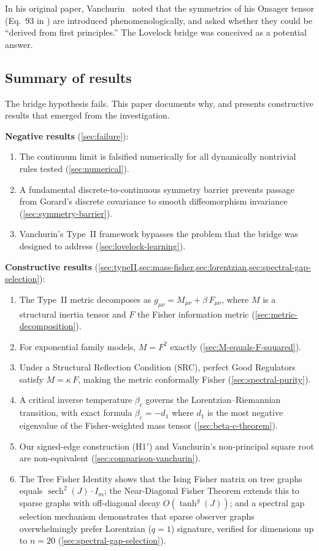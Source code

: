 \documentclass[11pt]{article}
\theoremstyle{definition}
\theoremstyle{remark}
\begin{document}
In his original paper, Vanchurin~\cite{Vanchurin2020} noted that the
symmetries of his Onsager tensor (Eq.~93 in \cite{Vanchurin2020}) are
introduced phenomenologically, and asked whether they could be
``derived from first principles.''
The Lovelock bridge was conceived as a potential answer.

\subsection{Summary of results}
\label{sec:summary}

The bridge hypothesis fails.
This paper documents why, and presents constructive results that emerged
from the investigation.

\textbf{Negative results} (\cref{sec:failure}):
\begin{enumerate}
\item The continuum limit is falsified numerically for all dynamically
  nontrivial rules tested (\cref{sec:numerical}).
\item A fundamental discrete-to-continuous symmetry barrier prevents
  passage from Gorard's discrete covariance to smooth diffeomorphism
  invariance (\cref{sec:symmetry-barrier}).
\item Vanchurin's Type~II framework bypasses the problem that the bridge
  was designed to address (\cref{sec:lovelock-learning}).
\end{enumerate}

\textbf{Constructive results} (\cref{sec:typeII,sec:mass-fisher,sec:lorentzian,sec:spectral-gap-selection}):
\begin{enumerate}
\item The Type~II metric decomposes as $g_{\mu\nu} = M_{\mu\nu} +
  \beta\,F_{\mu\nu}$, where $M$ is a structural inertia tensor and $F$ the
  Fisher information metric (\cref{sec:metric-decomposition}).
\item For exponential family models, $M = F^2$ exactly
  (\cref{sec:M-equals-F-squared}).
\item Under a Structural Reflection Condition (SRC), perfect Good Regulators
  satisfy $M = \kappa\,F$, making the metric conformally Fisher
  (\cref{sec:spectral-purity}).
\item A critical inverse temperature $\beta_c$ governs the
  Lorentzian--Riemannian transition, with exact formula
  $\beta_c = -d_1$ where $d_1$ is the most negative eigenvalue of the
  Fisher-weighted mass tensor (\cref{sec:beta-c-theorem}).
\item Our signed-edge construction (H1$'$) and Vanchurin's non-principal
  square root are non-equivalent (\cref{sec:comparison-vanchurin}).
\item The Tree Fisher Identity shows that the Ising Fisher matrix on
  tree graphs equals $\operatorname{sech}^2(J) \cdot I_m$; the
  Near-Diagonal Fisher Theorem extends this to sparse graphs with
  off-diagonal decay $O(\tanh^g(J))$; and a spectral gap selection
  mechanism demonstrates that sparse observer graphs overwhelmingly
  prefer Lorentzian ($q = 1$) signature, verified for dimensions up
  to $n = 20$ (\cref{sec:spectral-gap-selection}).
\end{enumerate}
\end{document}
